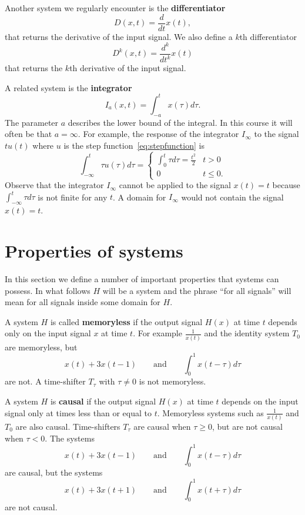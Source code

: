 \documentclass[11pt,a4paper]{book}
\theoremstyle{plain}
\numberwithin{equation}{section}
\newcommand{\reals}{{\mathbb R}}
\newcommand{\term}{\textbf}
\begin{document}
Another system we regularly encounter is the \term{differentiator}
\[
D(x,t) = \frac{d}{dt} x(t),
\]
that returns the derivative of the input signal.  We also define a $k$th differentiator
\[
D^k(x,t) = \frac{d^k}{dt^k} x(t)
\]
that returns the $k$th derivative of the input signal.  %

A related system is the \term{integrator}
\[
I_a(x,t) = \int_{-a}^{t} x(\tau) d\tau.
\]
The parameter $a$ describes the lower bound of the integral.  In this course it will often be that $a=\infty$.  For example, the response of the integrator $I_{\infty}$ to the signal $t u(t)$ where $u$ is the step function~\eqref{eq:stepfunction} is
\[
\int_{-\infty}^{t} \tau u(\tau) d\tau = \begin{cases}
\int_{0}^{t} \tau d\tau = \frac{t^2}{2} & t > 0 \\
0 & t \leq 0.
\end{cases}
\]
Observe that the integrator $I_\infty$ cannot be applied to the signal $x(t) = t$ because $\int_{-\infty}^{t} \tau d\tau$ is not finite for any $t$.  A domain for $I_\infty$ would not contain the signal $x(t) = t$. 

\section{Properties of systems}

In this section we define a number of important properties that systems can possess.  In what follows $H$ will be a system and the phrase ``for all signals'' will mean for all signals inside some domain for $H$.  %

A system $H$ is called \term{memoryless} if the output signal $H(x)$ at time $t$ depends only on the input signal $x$ at time $t$.  For example $\frac{1}{x(t)}$ and the identity system $T_0$ are memoryless, but 
\[
x(t) + 3 x(t-1) \qquad \text{and} \qquad \int_{0}^{1} x(t - \tau) d\tau
\] 
are not.  A time-shifter $T_\tau$ with $\tau \neq 0$ is not memoryless.

A system $H$ is \term{causal} if the output signal $H(x)$ at time $t$ depends on the input signal only at times less than or equal to $t$.  Memoryless systems such as $\frac{1}{x(t)}$ and $T_0$ are also causal.  Time-shifters $T_\tau$ are causal when $\tau \geq 0$, but are not causal when $\tau < 0$.  The systems 
\[
x(t) + 3 x(t-1) \qquad \text{and} \qquad \int_{0}^{1} x(t - \tau) d\tau
\] 
are causal, but the systems 
\[
x(t) + 3 x(t+1) \qquad \text{and} \qquad \int_{0}^{1} x(t + \tau) d\tau
\] 
are not causal.
\end{document}
